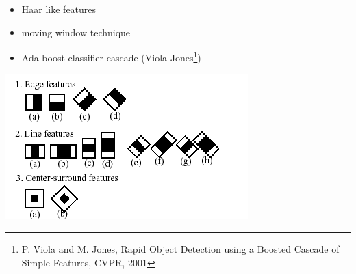\begin{xpsectionbox}{}{}


\begin{minipage}{0.5\linewidth}

{\vspace*{0.2cm}\noindent\hspace*{0.2cm}{\bf\Titlesize Method}\newline}{\vspace{-0.75cm}}

\begin{itemize}
	  \item Haar like features  
	  \item moving window technique
	  \item Ada boost classifier cascade (Viola-Jones\footnote{P. Viola and M. Jones, Rapid Object Detection using a Boosted Cascade of Simple Features, CVPR, 2001})
\end{itemize}
\begin{center}
			\includegraphics[height=0.25\linewidth]{images/Haar_features}
\end{center}

{\vspace*{0.2cm}\noindent\hspace*{0.2cm}{\bf\Titlesize Drawbacks}\newline}{\vspace{-0.75cm}}


\end{minipage}
\end{xpsectionbox}
